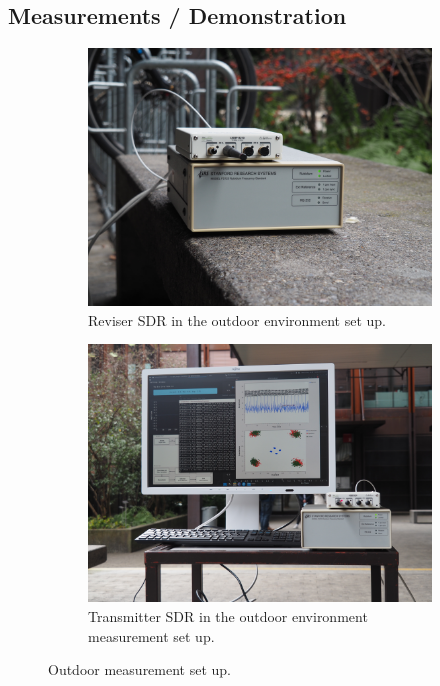\subsection{Measurements / Demonstration}


\begin{figure}
	\centering
	\hfill
	\begin{subfigure}[t]{.47\linewidth}
		\includegraphics[frame, width = \linewidth]{figures/picture/PC210002.JPG}
		\caption{
			Reviser SDR in the outdoor environment set up.
			\label{fig:sdr1}
		}
	\end{subfigure}
	\hfill
	\begin{subfigure}[t]{.47\linewidth}
		\centering
		\includegraphics[frame, width = \linewidth]{figures/picture/PC210011.JPG}
		\caption{
		 Transmitter SDR in the outdoor environment measurement set up.
			\label{fig:sdr2}
		}
	\end{subfigure}
	\hfill
	\caption{
		Outdoor measurement set up.
		\label{fig:mesurement-set-up-outside}
	}
\end{figure}


